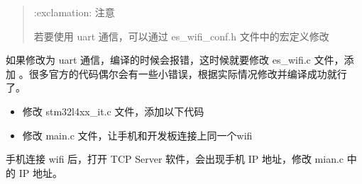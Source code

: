 \documentclass[a4paper,12pt,english]{sphinxmanual}
\begin{document}
\begin{quote}

\sphinxAtStartPar
:exclamation: 注意

\sphinxAtStartPar
若要使用 uart 通信，可以通过 es\_wifi\_conf.h 文件中的宏定义修改

\begin{sphinxVerbatim}[commandchars=\\\{\}]
\end{sphinxVerbatim}
\end{quote}

\sphinxAtStartPar
如果修改为 uart 通信，编译的时候会报错，这时候就要修改 es\_wifi.c 文件，添加 。很多官方的代码偶尔会有一些小错误，根据实际情况修改并编译成功就行了。

\sphinxAtStartPar
{}

\sphinxAtStartPar
{}
\begin{itemize}
\item {} 
\sphinxAtStartPar
修改 stm32l4xx\_it.c 文件，添加以下代码

\end{itemize}

\begin{sphinxVerbatim}[commandchars=\\\{\}]
\end{sphinxVerbatim}
\begin{itemize}
\item {} 
\sphinxAtStartPar
修改 main.c 文件，让手机和开发板连接上同一个wifi

\end{itemize}

\sphinxAtStartPar
手机连接 wifi 后，打开 TCP Server 软件，会出现手机 IP 地址，修改 mian.c 中的 IP 地址。
\end{document}
